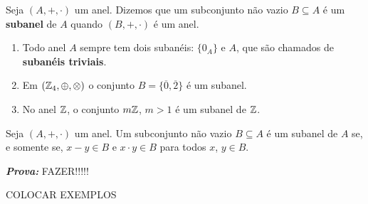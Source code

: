 \documentclass{beamer}
\begin{document}
    \begin{frame}
        \begin{definicao}
            Seja $(A, +, \cdot)$ um anel. Dizemos que um subconjunto n{\~a}o vazio $B\subseteq A$ {\'e} um \textbf{subanel} de $A$ quando $(B, +, \cdot)$ \'e um anel.
        \end{definicao}

        \begin{exemplos}
            \begin{enumerate}[label={\arabic*})]
                \item Todo anel $A$ sempre tem dois suban{\'e}is: $\{0_{A}\}$ e $A$, que s{\~a}o chamados de \textbf{suban{\'e}is triviais}.

                \vspace{.5cm}

                \item Em $(\mathbb{Z}_4,\oplus,\otimes)$ o conjunto $B = \{\overline{0}, \overline{2}\}$ \'e um subanel.

                \vspace{.5cm}
                
                \item No anel $\mathbb{Z}$, o conjunto $m\mathbb{Z}$, $m > 1$ {\'e} um subanel de $\mathbb{Z}$.

                \vspace{.5cm}
            \end{enumerate} 
        \end{exemplos}
    \end{frame}

    \begin{frame}
        \begin{proposicao}
            Seja $(A, +,\cdot)$ um anel. Um subconjunto n{\~a}o vazio $B\subseteq A$ {\'e} um subanel de $A$ se, e somente se, $x - y \in B$ e $x\cdot y \in B$ para todos $x$, $y \in B$.
        \end{proposicao}

        \noindent \textbf{\textit{Prova: }}FAZER!!!!!

        \begin{exemplos}
            COLOCAR EXEMPLOS
        \end{exemplos}
    \end{frame}
\end{document}
